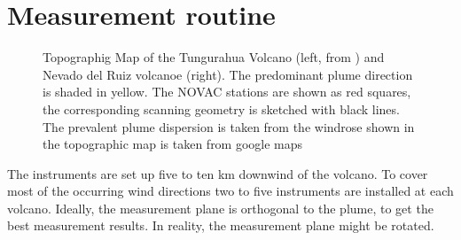 		\section{Measurement routine}
		\begin{figure}[h]
			\hspace*{-0.8cm}
			\caption{Topographig Map of the Tungurahua Volcano (left, from \cite{hidalgo2015so2}) and Nevado del Ruiz volcanoe (right). The predominant plume direction is shaded in yellow.  The NOVAC stations are shown as red squares, the corresponding scanning geometry is sketched with black lines. The prevalent plume dispersion is taken from the windrose shown in \citet{Windrose} the topographic map is taken from google maps}
		\label{fig:maptungurahua2}
	\end{figure}
	
		The instruments are set up five to ten km downwind of the volcano. To cover most of the occurring wind directions two to five instruments are installed at each volcano. Ideally, the measurement plane is orthogonal to the plume, to get the best measurement results. In reality, the measurement plane might be rotated.\\
		
